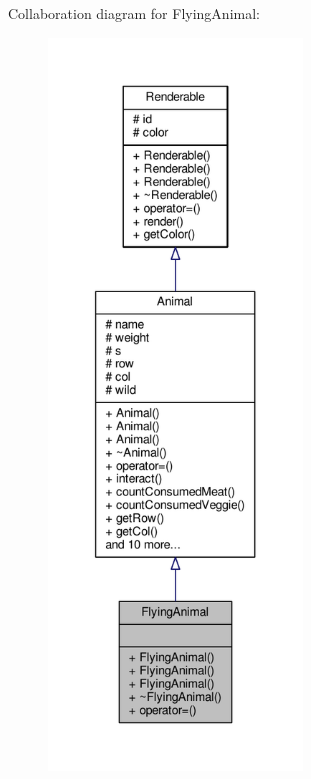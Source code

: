 Collaboration diagram for Flying\+Animal\+:
\nopagebreak
\begin{figure}[H]
\begin{center}
\leavevmode
\includegraphics[height=550pt]{classFlyingAnimal__coll__graph}
\end{center}
\end{figure}

